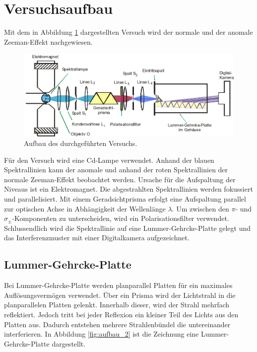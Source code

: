 \section{Versuchsaufbau}
\label{sec:Versuchaufbau}

Mit dem in Abbildung \ref{fig:aufbau_1} dargestellten Versuch wird der normale und der anomale Zeeman-Effekt nachgewiesen.

\begin{figure}[H]
  \centering
  \includegraphics[width=.75\textwidth]{ressources/Aufbau.png}
  \caption{Aufbau des durchgeführten Versuchs\cite{skript}.}
  \label{fig:aufbau_1}
\end{figure}

Für den Versuch wird eine Cd-Lampe verwendet. Anhand der blauen Spektrallinien kann der anomale und anhand der roten Spektrallinien der normale Zeeman-Effekt beobachtet werden. Ursache für die Aufspaltung der Niveaus ist ein Elektromagnet. Die abgestrahlten Spektrallinien werden fokussiert und parallelisiert. Mit einem Geradsichtprisma erfolgt eine Aufspaltung parallel zur optischen Achse in Abhängigkeit der Wellenlänge $\lambda$. Um zwischen den $\pi$- und $\sigma_\pm$-Komponenten zu unterscheiden, wird ein Polarisationsfilter verwendet. Schlussendlich wird die Spektrallinie auf eine Lummer-Gehrcke-Platte gelegt und das Interferenzmuster mit einer Digitalkamera aufgezeichnet.

\subsection{Lummer-Gehrcke-Platte}

Bei Lummer-Gehrcke-Platte werden planparallel Platten für ein maximales Auflösungsvermögen verwendet. Über ein Prisma wird der Lichtstrahl in die planparallelen Platten gelenkt. Innerhalb dieser, wird der Strahl mehrfach reflektiert. Jedoch tritt bei jeder Reflexion ein kleiner Teil des Lichts aus den Platten aus. Dadurch entstehen mehrere Strahlenbündel die untereinander interferieren. In Abbildung \ref{fig:aufbau_2} ist die Zeichnung eine Lummer-Gehrcke-Platte dargestellt. 

